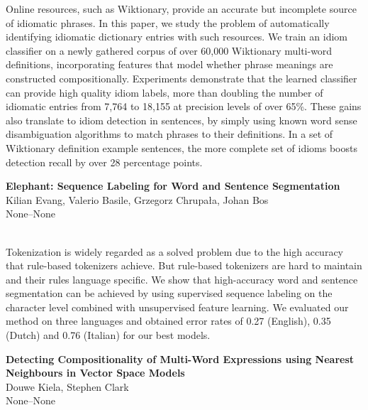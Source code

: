 \documentclass[twoside,makeidx]{book}
\renewcommand{\normalsize}{\fontsize{8}{9}\selectfont}
\renewcommand{\small}{\fontsize{7}{8}\selectfont}
\begin{document}
\nopagebreak%
\noindent%
{\small Online resources, such as Wiktionary, provide an accurate but incomplete source of idiomatic phrases.  In this paper, we study the problem of automatically identifying idiomatic dictionary entries with such resources. We train an idiom classifier on a newly gathered corpus of over 60,000 Wiktionary multi-word definitions, incorporating features that model whether phrase meanings are constructed compositionally. Experiments demonstrate that the learned classifier can provide high quality idiom labels, more than doubling the number of idiomatic entries from 7,764 to 18,155 at precision levels of over 65\%.  These gains also translate to idiom detection in sentences, by simply using known word sense disambiguation algorithms to match phrases to their definitions.  In a set of Wiktionary definition example sentences, the more complete set of idioms boosts detection recall by over 28 percentage points.}
\par\vspace{2em}\noindent%
\begin{minipage}{\linewidth}%
\begin{center}
\textbf{\normalsize Elephant: Sequence Labeling for Word and Sentence Segmentation}\\
\normalsize  Kilian Evang,  Valerio Basile,  Grzegorz Chrupa{\l}a,  Johan Bos\\
{\small None--None}\\
\end{center}
\end{minipage}\\[0.5em]
\nopagebreak%
\noindent%
{\small Tokenization is widely regarded as a solved problem due to the high accuracy that rule-based tokenizers achieve. But rule-based tokenizers are hard to maintain and their rules language specific. We show that high-accuracy word and sentence segmentation can be achieved by using supervised sequence labeling on the character level combined with unsupervised feature learning. We evaluated our method on three languages and obtained error rates of 0.27 \textperthousand (English), 0.35 \textperthousand (Dutch) and 0.76 \textperthousand (Italian) for our best models.}
\par\vspace{2em}\noindent%
\begin{minipage}{\linewidth}%
\begin{center}
\textbf{\normalsize Detecting Compositionality of Multi-Word Expressions using Nearest Neighbours in Vector Space Models}\\
\normalsize  Douwe Kiela,  Stephen Clark\\
{\small None--None}\\
\end{center}
\end{minipage}\\[0.5em]
\end{document}

